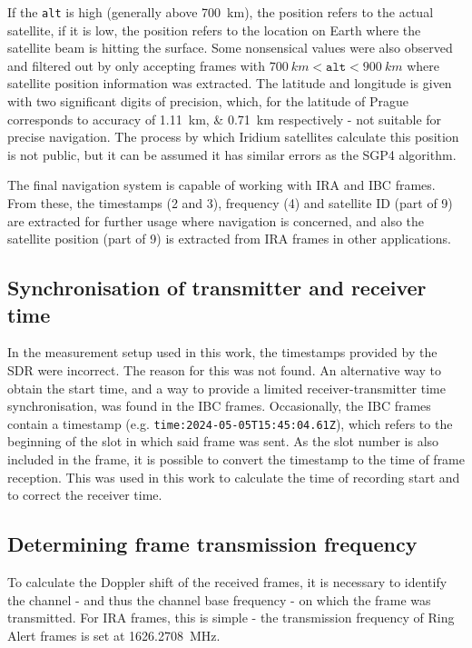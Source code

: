 If the \texttt{alt} is high (generally above \qty{700}{km}), the position refers to the actual satellite, if it is low, the position refers to the location on Earth where the satellite beam is hitting the surface\cite{des14}.
Some nonsensical values were also observed and filtered out by only accepting frames with $\qty{700}{km} < \texttt{alt} < \qty{900}{km}$ where satellite position information was extracted. The latitude and longitude is given with two significant digits of precision, which, for the latitude of Prague corresponds to accuracy of \qtylist{1.11; 0.71}{km} respectively - not suitable for precise navigation. The process by which Iridium satellites calculate this position is not public, but it can be assumed it has similar errors as the SGP4 algorithm.

The final navigation system is capable of working with IRA and IBC frames. From these, the timestamps (2 and 3), frequency (4) and satellite ID (part of 9) are extracted for further usage where navigation is concerned, and also the satellite position (part of 9) is extracted from IRA frames in other applications.


\subsection{Synchronisation of transmitter and receiver time}
In the measurement setup used in this work, the timestamps provided by the SDR were incorrect. The reason for this was not found. An alternative way to obtain the start time, and a way to provide a limited receiver-transmitter time synchronisation, was found in the IBC frames. Occasionally, the IBC frames contain a timestamp (e.g. \texttt{time:2024-05-05T15:45:04.61Z}), which refers to the beginning of the slot in which said frame was sent. As the slot number is also included in the frame, it is possible to convert the timestamp to the time of frame reception\cite{des14}. This was used in this work to calculate the time of recording start and to correct the receiver time.


\subsection{Determining frame transmission frequency}
To calculate the Doppler shift of the received frames, it is necessary to identify the channel - and thus the channel base frequency -  on which the frame was transmitted. For IRA frames, this is simple - the transmission frequency of Ring Alert frames is set at \qty{1626.2708}{MHz}. 

